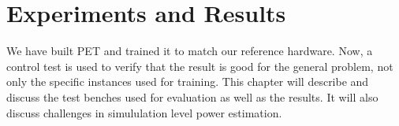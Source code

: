 \chapter{Experiments and Results}

We have built PET and trained it to match our reference hardware. Now, a control
test is used to verify that the result is good for the general problem, not only
the specific instances used for training. This chapter will describe and discuss
the test benches used for evaluation as well as the results. It will also
discuss challenges in simululation level power estimation.




